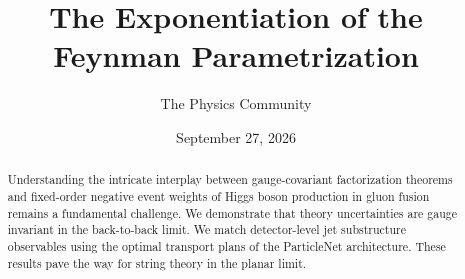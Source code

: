 \documentclass[11pt]{article}
\title{The Exponentiation of the Feynman Parametrization}
\author{The Physics Community}
\date{September 27, 2026}
\begin{document}
\maketitle
\begin{abstract}
Understanding the intricate interplay between gauge-covariant
factorization theorems and fixed-order negative event weights of Higgs
boson production in gluon fusion remains a fundamental challenge. We
demonstrate that theory uncertainties are gauge invariant in the
back-to-back limit. We match detector-level jet substructure observables
using the optimal transport plans of the ParticleNet architecture. These
results pave the way for string theory in the planar limit.
\end{abstract}
\tableofcontents



\nocite{*}


\end{document}
